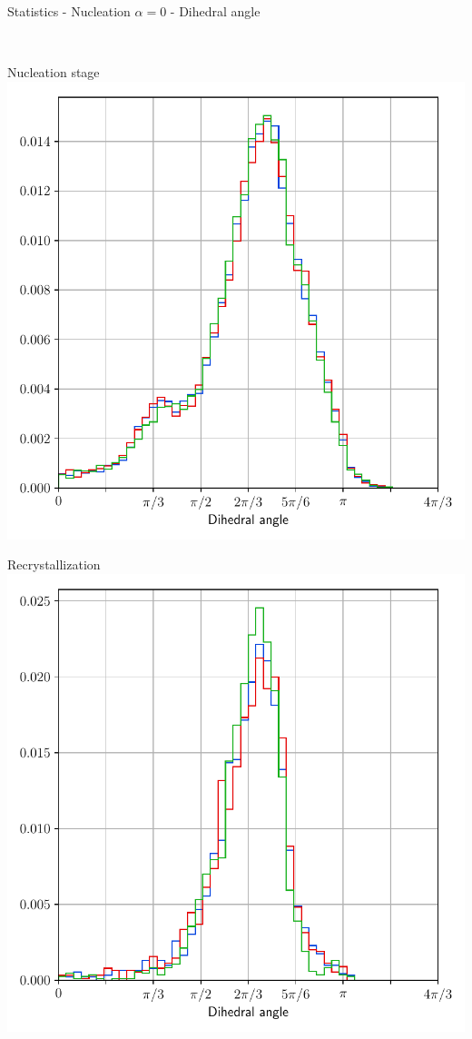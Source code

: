 \documentclass[usenames,dvipsnames]{beamer}
\begin{document}
\begin{frame}{Statistics - Nucleation $\alpha = 0$ - Dihedral angle}
\begin{minipage}{0.5\textwidth}
    \end{minipage}\\
    \vfill
    \begin{minipage}{0.5\textwidth}
    \centering
    \scriptsize
    Nucleation stage
    \includegraphics[trim={0 2.6em 0 1.1em},clip=true,scale=0.34]{figures/stored_energy/SE/dihedral/000110_nuclconstant_set.pdf}
    \end{minipage}%
    \begin{minipage}{0.5\textwidth}
    \centering
    \scriptsize
    Recrystallization
    \includegraphics[trim={0 2.6em 0 1.1em},clip=true,scale=0.34]{figures/stored_energy/SE/dihedral/000240_nuclconstant_set.pdf}
    \end{minipage}
\end{frame}
\end{document}
